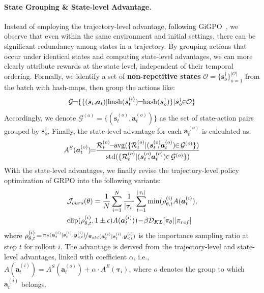 \documentclass[11pt]{article}
\begin{document}
\paragraph{State Grouping \& State-level Advantage.} Instead of employing the trajectory-level advantage, \textcolor{black}{following} GiGPO~\cite{feng2025group}, we observe that even within the same environment and initial settings, there can be significant redundancy among states in a trajectory. By grouping actions that occur under identical states and computing state-level advantages, we can more clearly attribute rewards at the state level, independent of their temporal ordering. Formally, we identify a set of \textbf{non-repetitive states} $\mathcal{O}\!\!=\!\!\{\bm{s}^\dagger_{o}\}_{o=1}^{|\mathcal{O}|}$ from the batch with hash-maps, then group the actions like:
\begin{equation}
    \mathcal{G}\!\!=\!\!\{\{(\bm{s}_t,\!\bm{a}_t)|{\rm hash}(\bm{s}^{(i)}_t)\!\!=\!\!{\rm hash}(\bm{s}^{\dagger}_{o})\}| \bm{s}^\dagger_{o} \!\!\in\!\! \mathcal{O}\}
\end{equation}
Accordingly, we denote $\mathcal{G}^{(o)}\!\!=\!\!\{(\bm{s}^{(o)}_t\!\!,\bm{a}^{(o)}_t)\}$ as the set of state-action pairs grouped by $\bm{s}^\dagger_{o}$. Finally, the state-level advantage for each $\bm{a}_t^{(o)}$ is calculated as:
\begin{equation}
    A^S(\bm{a}^{(o)}_t)\!\!=\!\!\frac{\mathcal{R}^{(o)}_t\!\!-\!\!{\rm avg}(\{\mathcal{R}^{(o)}_t|(\bm{s}^{(o)}_t\!\!\!,\bm{a}^{(o)}_t)\!\!\in\!\mathcal{G}^{(o)}\})}{{\rm std}(\{\mathcal{R}^{(o)}_t|(\bm{s}^{(o)}_t\!\!\!,\bm{a}^{(o)}_t)\!\!\in\!\mathcal{G}^{(o)}\})}
\end{equation}
With the state-level advantages, we finally revise the trajectory-level policy optimization of GRPO into the following  variants: 
\begin{equation}
\begin{split} 
    &\mathcal{J}_{ours}(\theta)=\frac{1}{N}\sum_{i=1}^N\frac{1}{|\bm{\tau}_i|}\sum_{t=1}^{|\bm{\tau}_i|}{\rm min}(\rho_{\theta, t}^{(i)} A(\bm{a}_t^{(i)}), \\
    &{\rm clip}(\rho_{\theta, t}^{(i)}, 1\pm \epsilon)A(\bm{a}_t^{(i)}))\! -\!\beta\mathcal{D}_{KL}[\pi_\theta  ||\pi_{ ref} ]
\end{split}
\end{equation}
\textcolor{black}{where} $\rho_{\theta, t}^{(i)}\!=\!\nicefrac{\bm{\pi}_\theta(\bm{a}^{(i)}_{t}|\bm{s}_t^{(i)},\bm{y}^{(i)}_{<t})}{\bm{\pi}_{old}(\bm{a}^{(i)}_{t}|\bm{s}_t^{(i)},\bm{y}^{(i)}_{<t})}$ is the   importance sampling ratio at step $t$ for rollout $i$. The advantage is derived from the trajectory-level and state-level advantages, linked with coefficient $\alpha$, i.e., $A(\bm{a}_t^{(i)})\!\!=\!\!A^S(\bm{a}^{(o)}_t)\!+\alpha\!\cdot\!A^E(\bm{\tau}_i)$, where $o$ denotes the group to which $\bm{a}_t^{(i)}$ belongs. 
\end{document}
